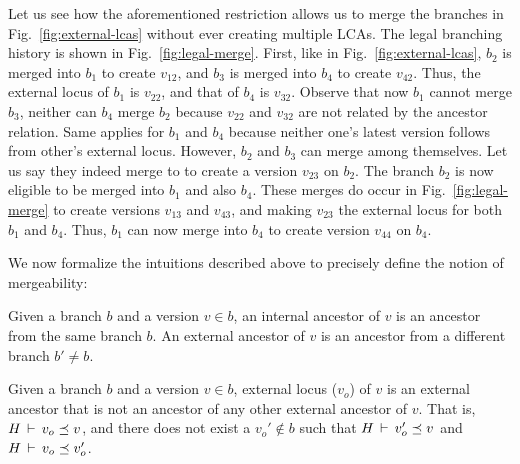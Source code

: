 

Let us see how the aforementioned restriction allows us to merge the
branches in Fig.~\ref{fig:external-lcas} without ever creating
multiple LCAs. The legal branching history is shown in
Fig.~\ref{fig:legal-merge}. First, like in
Fig.~\ref{fig:external-lcas}, $b_2$ is merged into $b_1$ to create
$v_{12}$, and $b_3$ is merged into $b_4$ to create $v_{42}$. Thus, the
external locus of $b_1$ is $v_{22}$, and that of $b_4$ is $v_{32}$.
Observe that now $b_1$ cannot merge $b_3$, neither can $b_4$ merge
$b_2$ because $v_{22}$ and $v_{32}$ are not related by the ancestor
relation. Same applies for $b_1$ and $b_4$ because neither one's
latest version follows from other's external locus.  However, $b_2$
and $b_3$ can merge among themselves. Let us say they indeed merge to
to create a version $v_{23}$ on $b_2$. The branch $b_2$ is now
eligible to be merged into $b_1$ and also $b_4$. These merges do occur
in Fig.~\ref{fig:legal-merge} to create versions $v_{13}$ and
$v_{43}$, and making $v_{23}$ the external locus for both $b_1$ and
$b_4$. Thus, $b_1$ can now merge into $b_4$ to create version $v_{44}$
on $b_4$.

We now formalize the intuitions described above to precisely define
the notion of mergeability:

\begin{definition} 
Given a branch $b$ and a version $v\in b$, an internal ancestor of $v$
is an ancestor from the same branch $b$. An external ancestor of $v$
is an ancestor from a different branch $b'\neq b$. 
\end{definition}

\begin{definition} 
Given a branch $b$ and a version $v\in b$, external locus ($v_o$) of
$v$ is an external ancestor that is not an ancestor of any other
external ancestor of $v$. That is, $H\,\vdash\,v_o \preceq v$, and
there does not exist a $v_o' \not\in b$ such that $H\,\vdash\,v_o'
\preceq v$ and $H\,\vdash\,v_o \preceq v_o'$. 
\end{definition}

